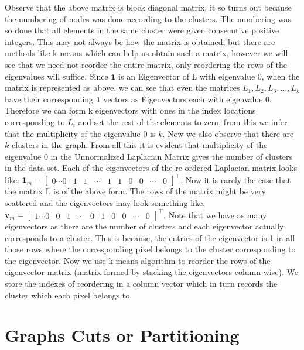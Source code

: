 \documentclass[english]{article}
\theoremstyle{plain}
\begin{document}
Observe that the above matrix is block diagonal matrix, it so turns out because the numbering of nodes was done according to the clusters. The numbering was so done that all elements in the same cluster were given consecutive positive integers. This may not always be how the matrix is obtained, but there are methods like k-means which can help us obtain such a matrix, however we will see that we need not reorder the entire matrix, only reordering the rows of the eigenvalues will suffice. Since $\boldsymbol{1}$ is an Eigenvector of L with eigenvalue 0, when the matrix is represented as above, we can see that even the matrices $L_{1}, L_{2}, L_{3}, ..., L_{k}$ have their corresponding $\boldsymbol{1}$ vectors as Eigenvectors each with eigenvalue 0. Therefore we can form k eigenvectors with ones in the index locations corresponding to $L_{i}$ and set the rest of the elements to zero, from this we infer that the multiplicity of the eigenvalue 0 is $k$. Now we also observe that there are $k$ clusters in the graph. From all this it is evident that multiplicity of the eigenvalue 0 in the Unnormalized Laplacian Matrix gives the number of clusters in the data set.
Each of the eigenvectors of the re-ordered Laplacian matrix looks like:
$
\boldsymbol{1}_{m} = \begin{bmatrix}
0 \cdots 0 & 1 & 1 & \cdots & 1 & 1 & 0 & 0 & \cdots & 0
\end{bmatrix}^{\top}
$.
Now it is rarely the case that the matrix L is of the above form. The rows of the matrix might be very scattered and the eigenvectors may look something like,
$
\boldsymbol{v}_{m} = \begin{bmatrix}
1 \cdots 0 & 0 & 1 & \cdots & 0 & 1 & 0 & 0 & \cdots & 0
\end{bmatrix}^{\top}
$.
Note that we have as many eigenvectors as there are the number of clusters and each eigenvector actually corresponds to a cluster. This is because, the entries of the eigenvector is 1 in all those rows where the corresponding pixel belongs to the cluster corresponding to the eigenvector. Now we use k-means algorithm to reorder the rows of the eigenvector matrix (matrix formed by stacking the eigenvectors column-wise). We store the indexes of reordering in a column vector which in turn records the cluster which each pixel belongs to.

\section{Graphs Cuts or Partitioning}
\end{document}
